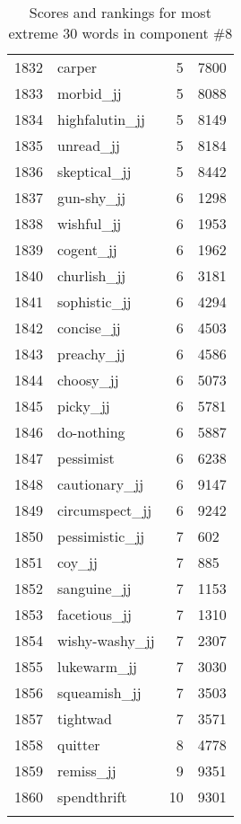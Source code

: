 \begin{longtable}[!htbp]{| rlr@{.}l |}
    1832 & carper & 5 & 7800 \\
    1833 & morbid\_jj & 5 & 8088 \\
    1834 & highfalutin\_jj & 5 & 8149 \\
    1835 & unread\_jj & 5 & 8184 \\
    1836 & skeptical\_jj & 5 & 8442 \\
    1837 & gun-shy\_jj & 6 & 1298 \\
    1838 & wishful\_jj & 6 & 1953 \\
    1839 & cogent\_jj & 6 & 1962 \\
    1840 & churlish\_jj & 6 & 3181 \\
    1841 & sophistic\_jj & 6 & 4294 \\
    1842 & concise\_jj & 6 & 4503 \\
    1843 & preachy\_jj & 6 & 4586 \\
    1844 & choosy\_jj & 6 & 5073 \\
    1845 & picky\_jj & 6 & 5781 \\
    1846 & do-nothing & 6 & 5887 \\
    1847 & pessimist & 6 & 6238 \\
    1848 & cautionary\_jj & 6 & 9147 \\
    1849 & circumspect\_jj & 6 & 9242 \\
    1850 & pessimistic\_jj & 7 & 602 \\
    1851 & coy\_jj & 7 & 885 \\
    1852 & sanguine\_jj & 7 & 1153 \\
    1853 & facetious\_jj & 7 & 1310 \\
    1854 & wishy-washy\_jj & 7 & 2307 \\
    1855 & lukewarm\_jj & 7 & 3030 \\
    1856 & squeamish\_jj & 7 & 3503 \\
    1857 & tightwad & 7 & 3571 \\
    1858 & quitter & 8 & 4778 \\
    1859 & remiss\_jj & 9 & 9351 \\
    1860 & spendthrift & 10 & 9301 \\
    \hline
    \caption{Scores and rankings for most extreme 30 words in component \#8} \\
\end{longtable}
